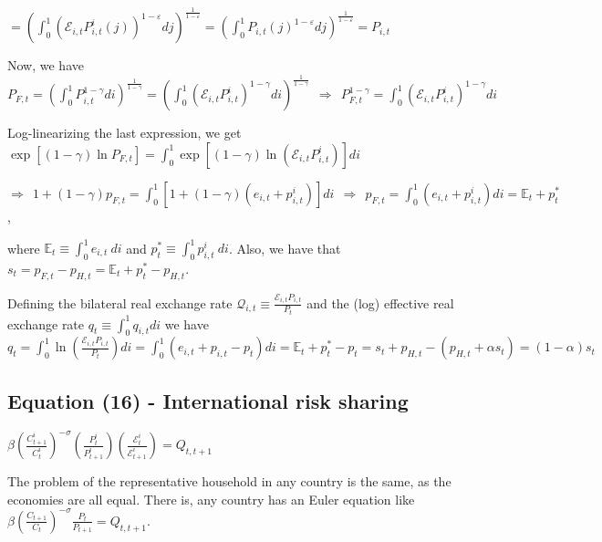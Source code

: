 \documentclass[
]{article}
\begin{document}
\(\displaystyle = \left( \int_0^1 \left( \mathcal{E}_{i,t}P_{i,t}^i(j)\right) ^{{1-\varepsilon}}dj \right) ^{\frac{1}{1-\varepsilon}} = \left( \int_0^1 P_{i,t}(j)^{{1-\varepsilon}}dj \right) ^{\frac{1}{1-\varepsilon}} = P_{i,t}\)

Now, we have
\(\displaystyle P_{F,t}= \left( \int_0^1 P_{i,t}^{{1-\gamma}}di \right) ^{\frac{1}{1-\gamma}} = \left( \int_0^1 \left( \mathcal{E}_{i,t}P_{i,t}^i \right)^{{1-\gamma}}di \right)^{\frac{1}{1-\gamma}} \ \ \Rightarrow \ \ P_{F,t}^{1-\gamma} = \int_0^1 \left( \mathcal{E}_{i,t}P_{i,t}^i \right)^{{1-\gamma}}di\)

Log-linearizing the last expression, we get
\(\displaystyle \exp \left[(1-\gamma)\ln P_{F,t} \right] = \int_0^1 \exp \left[(1-\gamma) \ln \left( \mathcal{E}_{i,t}P_{i,t}^i \right) \right]di\)

\(\Rightarrow \ \  \displaystyle 1 + (1-\gamma)p_{F,t} = \int_0^1 \left[ 1+ (1-\gamma)(e_{i,t}+p_{i,t}^i)\right]di \ \ \Rightarrow \ \ p_{F,t} = \int_0^1 (e_{i,t}+p_{i,t}^i)di=\mathbb{E}_t+p_t^*\),

where \(\displaystyle \mathbb{E}_t \equiv \int_0^1 e_{i,t} \ di\) and
\(\displaystyle p_t^*\equiv \int_0^1 p_{i,t}^i \ di\). Also, we have
that \(s_t = p_{F,t}-p_{H,t}=\mathbb{E}_t + p_t^*-p_{H,t}\).

Defining the bilateral real exchange rate
\(\displaystyle \mathcal{Q}_{i,t} \equiv \frac{\mathcal{E}_{i,t}P_{i,t}}{P_t}\)
and the (log) effective real exchange rate
\(\displaystyle q_t \equiv \int_0^1 q_{i,t}di\) we have
\(\displaystyle q_t = \int_0^1 \ln \left( \frac{\mathcal{E}_{i,t}P_{i,t}}{P_t} \right)di= \int_0^1 \left(e_{i,t}+p_{i,t}-p_t \right)di = \mathbb{E}_t+p_t^*-p_t = s_t+p_{H,t}-(p_{H,t}+\alpha s_t) = (1-\alpha)s_t\)

\vspace{12pt}

\hypertarget{equation-16---international-risk-sharing}{%
\subsection{Equation (16) - International risk
sharing}\label{equation-16---international-risk-sharing}}

\(\displaystyle \beta \left( \frac{C_{t+1}^i}{C_t^i} \right)^{-\sigma} \left(\frac{P_t^i }{P_{t+1}^i}\right) \left(\frac{ \mathcal{E}_t^i}{ \mathcal{E}_{t+1}^i}\right) = Q_{t,t+1}\)

\vspace{8pt}

The problem of the representative household in any country is the same,
as the economies are all equal. There is, any country has an Euler
equation like
\(\displaystyle \beta \left( \frac{C_{t+1}}{C_t} \right)^{-\sigma} \frac{P_t}{P_{t+1}}= Q_{t,t+1}\).
\end{document}
